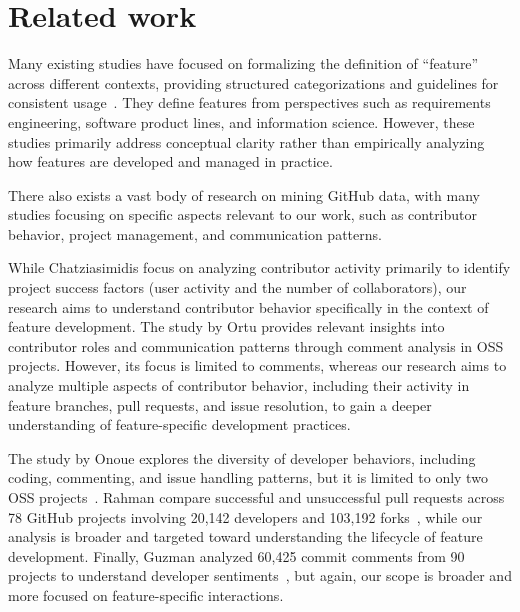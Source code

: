 \section{Related work}
\label{sec:related-work}
Many existing studies have focused on formalizing the definition of ``feature'' across different contexts, providing structured categorizations and guidelines for consistent usage~\cite{clas08,apel09, bane12,berg15,kala18,mole22}. 
They define features from perspectives such as requirements engineering, software product lines, and information science. 
However, these studies primarily address conceptual clarity rather than empirically analyzing how features are developed and managed in practice.

There also exists a vast body of research on mining GitHub data, with many studies focusing on specific aspects relevant to our work, such as contributor behavior, project management, and communication patterns. 

While Chatziasimidis \etal focus on analyzing contributor activity primarily to identify project success factors (\eg user activity and the number of collaborators)\cite{Chat15}, our research aims to understand contributor behavior specifically in the context of feature development. 
The study by Ortu \etal provides relevant insights into contributor roles and communication patterns through comment analysis in OSS projects\cite{Ortu18}. 
However, its focus is limited to comments, whereas our research aims to analyze multiple aspects of contributor behavior, including their activity in feature branches, pull requests, and issue resolution, to gain a deeper understanding of feature-specific development practices.

The study by Onoue \etal explores the diversity of developer behaviors, including coding, commenting, and issue handling patterns, but it is limited to only two OSS projects~\cite{Ono13}. 
Rahman \etal compare successful and unsuccessful pull requests across 78 GitHub projects involving 20,142 developers and 103,192 forks~\cite{Rah14}, while our analysis is broader and targeted toward understanding the lifecycle of feature development. 
Finally, Guzman \etal analyzed 60,425 commit comments from 90 projects to understand developer sentiments~\cite{Guz14}, but again, our scope is broader and more focused on feature-specific interactions.




